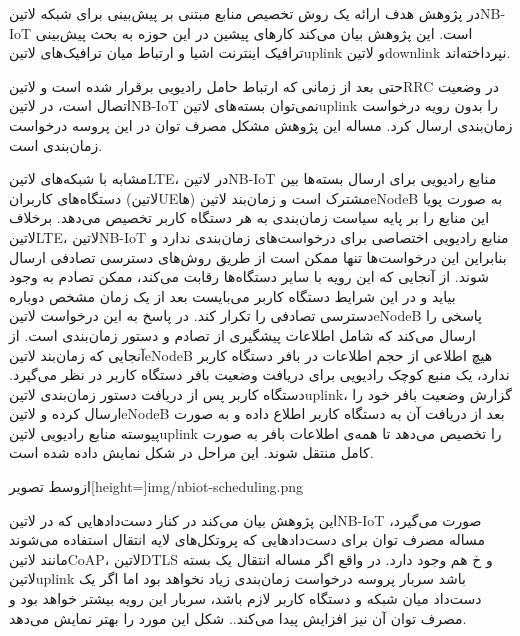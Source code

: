
در پژوهش  هدف ارائه یک روش تخصیص منابع مبتنی بر پیش‌بینی برای شبکه ‌لاتین{NB-IoT} است.
این پژوهش بیان می‌کند کارهای پیشین در این حوزه به بحث پیش‌بینی ترافیک اینترنت اشیا و ارتباط میان ترافیک‌های ‌لاتین{uplink} و ‌لاتین{downlink} نپرداخته‌اند.

حتی بعد از زمانی که ارتباط حامل رادیویی برقرار شده است و ‌لاتین{RRC} در وضعیت اتصال است، در ‌لاتین{NB-IoT} نمی‌توان بسته‌های ‌لاتین{uplink} را بدون
رویه درخواست زمان‌بندی ارسال کرد. مساله این پژوهش مشکل مصرف توان در این پروسه درخواست زمان‌بندی است.

مشابه با شبکه‌های ‌لاتین{LTE}، در ‌لاتین{NB-IoT} منابع رادیویی برای ارسال بسته‌ها بین دستگاه‌های کاربران (‌لاتین{UE}ها) مشترک است و
زمان‌بند ‌لاتین{eNodeB} به صورت پویا این منابع را بر پایه سیاست زمان‌بندی به هر دستگاه کاربر تخصیص می‌دهد.
برخلاف ‌لاتین{LTE}، ‌لاتین{NB-IoT} منابع رادیویی اختصاصی برای درخواست‌های زمان‌بندی ندارد و بنابراین این درخواست‌ها تنها ممکن است از طریق روش‌های دسترسی تصادفی ارسال شوند.
از آنجایی که این رویه با سایر دستگاه‌ها رقابت می‌کند، ممکن تصادم به وجود بیاید و در این شرایط دستگاه کاربر می‌بایست بعد از یک زمان مشخص دوباره دسترسی تصادفی را تکرار کند.
در پاسخ به این درخواست ‌لاتین{eNodeB} پاسخی را ارسال می‌کند که شامل اطلاعات پیشگیری از تصادم و دستور زمان‌بندی است.
از آنجایی که زمان‌بند ‌لاتین{eNodeB} هیچ اطلاعی از حجم اطلاعات در بافر دستگاه کاربر ندارد، یک منبع کوچک رادیویی برای دریافت وضعیت بافر دستگاه کاربر در نظر می‌گیرد.
دستگاه کاربر پس از دریافت دستور زمان‌بندی ‌لاتین{uplink}، گزارش وضعیت بافر خود را ارسال کرده و ‌لاتین{eNodeB} بعد از دریافت آن به دستگاه کاربر اطلاع داده و به صورت پیوسته
منابع رادیویی ‌لاتین{uplink} را تخصیص می‌دهد تا همه‌ی اطلاعات بافر به صورت کامل منتقل شوند.
این مراحل در شکل  نمایش داده شده است.

‌ازوسط
‌تصویر[height=\textwidth]{img/nbiot-scheduling.png}

این پژوهش بیان می‌کند در کنار دست‌دادهایی که در ‌لاتین{NB-IoT} صورت می‌گیرد، مساله مصرف توان برای دست‌دادهایی که پروتکل‌های لایه انتقال
استفاده می‌شوند مانند ‌لاتین{CoAP}، ‌لاتین{DTLS} و ‌خ هم وجود دارد.
در واقع اگر مساله انتقال یک بسته ‌لاتین{uplink} باشد سربار پروسه درخواست زمان‌بندی زیاد نخواهد بود اما اگر یک دست‌داد میان شبکه و دستگاه
کاربر لازم باشد، سربار این رویه بیشتر خواهد بود و مصرف توان آن نیز افزایش پیدا می‌کند.. شکل  این مورد را بهتر نمایش می‌دهد.

